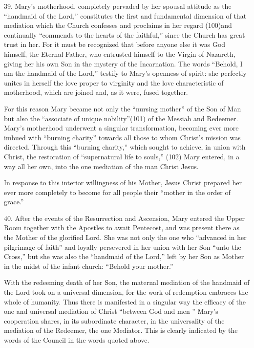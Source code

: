 \documentclass[oneside]{book}
\begin{document}
39. Mary's motherhood, completely pervaded by her spousal attitude as the
``handmaid of the Lord,'' constitutes the first and fundamental dimension of
that mediation which the Church confesses and proclaims in her regard (100)and
continually ``commends to the hearts of the faithful,'' since the Church has
great trust in her. For it must be recognized that before anyone else it was God
himself, the Eternal Father, who entrusted himself to the Virgin of Nazareth,
giving her his own Son in the mystery of the Incarnation. The words ``Behold, I
am the handmaid of the Lord,'' testify to Mary's openness of spirit: she
perfectly unites in herself the love proper to virginity and the love
characteristic of motherhood, which are joined and, as it were, fused together.

For this reason Mary became not only the ``nursing mother'' of the Son of Man
but also the ``associate of unique nobility''(101) of the Messiah and
Redeemer. Mary's motherhood underwent a singular transformation, becoming ever
more imbued with ``burning charity'' towards all those to whom Christ's mission
was directed. Through this ``burning charity,'' which sought to achieve, in
union with Christ, the restoration of ``supernatural life to souls,'' (102) Mary
entered, in a way all her own, into the one mediation of the man Christ Jesus.

 In response to this interior willingness of his Mother, Jesus Christ prepared
 her ever more completely to become for all people their ``mother in the order
 of grace.''

40. After the events of the Resurrection and Ascension, Mary entered the Upper
Room together with the Apostles to await Pentecost, and was present there as the
Mother of the glorified Lord. She was not only the one who ``advanced in her
pilgrimage of faith'' and loyally persevered in her union with her Son ``unto
the Cross,'' but she was also the ``handmaid of the Lord,'' left by her Son as
Mother in the midst of the infant church: ``Behold your mother.''

With the redeeming death of her Son, the maternal mediation of the handmaid of
the Lord took on a universal dimension, for the work of redemption embraces the
whole of humanity. Thus there is manifested in a singular way the efficacy of
the one and universal mediation of Christ ``between God and men '' Mary's
cooperation shares, in its subordinate character, in the universality of the
mediation of the Redeemer, the one Mediator. This is clearly indicated by the
words of the Council in the words quoted above.
\end{document}

